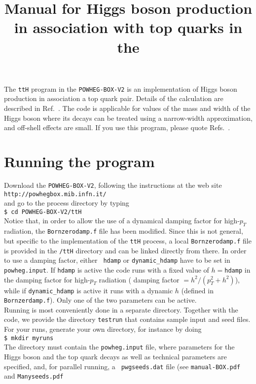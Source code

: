 \documentclass[a4paper,11pt]{article}
\title{Manual for  Higgs boson production in association with top quarks in the \POWHEGBOXV{}}
\date{}
\newcommand\POWHEGBOXV{{\tt POWHEG-BOX-V2}}
\begin{document}
\maketitle
%
\noindent
The {\tt ttH} program in the \POWHEGBOXV{} is an implementation of Higgs boson production in association a top quark pair. Details of the calculation are described in Ref.~\cite{HJRW}. 
%
The code is applicable for values of the mass and width of the Higgs boson where its decays can be treated using a narrow-width approximation, and off-shell effects are small. 
%
If you use this program, please quote Refs.~\cite{HJRW,DORW,DJORW,Alioli:2010xd}.
%
\section*{Running the program}
%
Download the \POWHEGBOXV{}, following the instructions at the web site
\\[2ex]
{\tt http://powhegbox.mib.infn.it/}
\\[2ex]
and go to the process directory by typing
\\[2ex]
{\tt \$ cd \POWHEGBOXV/ttH}
\\[2ex]
Notice that, in order to allow the use of a dynamical damping factor
for high-$p_T$ radiation, the {\tt Bornzerodamp.f} file has been
modified. Since this is not general, but specific to the
implementation of the {\tt ttH} process, a local {\tt Bornzerodamp.f}
file is provided in the {\tt /ttH} directory and can be linked
directly from there.  In order to use a damping factor, either {\tt
  hdamp} or {\tt dynamic\_hdamp} have to be set in {\tt powheg.input}.
If {\tt hdamp} is active the code runs with a fixed value of $h=${\tt hdamp} in
the damping factor for high-$p_T$ radiation ( damping factor
$=h^2/(p_T^2+h^2)$), while if {\tt dynamic\_hdamp} is active it runs
with a dynamic $h$ (defined in {\tt Bornzerdamp.f}). Only one of the
two parameters can be active.
\\[2ex]
Running is most conveniently done in a separate directory. Together
with the code, we provide the directory {\tt testrun} that contains
sample input and seed files.
\\[2ex]
For your runs, generate your own directory, for instance by doing
\\[2ex]
{\tt \$ mkdir myruns}
\\[2ex]
The directory must contain the {\tt powheg.input} file, where
parameters for the Higgs boson and the top quark decays as well as
technical parameters are specified, and, for parallel running, a {\tt
  pwgseeds.dat} file (see {\tt manual-BOX.pdf} and {\tt Manyseeds.pdf}
\end{document}
